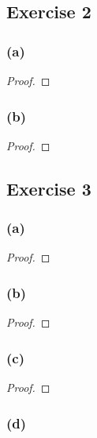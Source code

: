 \documentclass[14pt]{extarticle}
\begin{document}
\subsection{Exercise 2}

\subsubsection{(a)}

\begin{proof}

\end{proof}

\subsubsection{(b)}

\begin{proof}

\end{proof}

\subsection{Exercise 3}

\subsubsection{(a)}

\begin{proof}

\end{proof}

\subsubsection{(b)}

\begin{proof}

\end{proof}

\subsubsection{(c)}

\begin{proof}

\end{proof}

\subsubsection{(d)}
\end{document}
